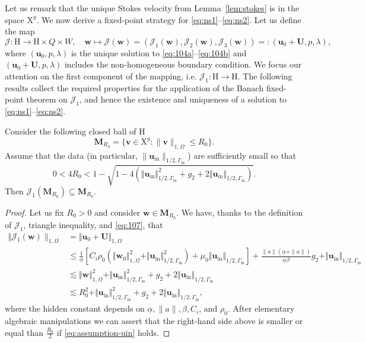 \documentclass[onefignum,onetabnum,reqno,a4paper,final]{siamart250211}
\def\O{\Omega}
\newcommand\bu{\boldsymbol{u}}
\newcommand\bv{\boldsymbol{v}}
\newcommand\bw{\boldsymbol{w}}
\newcommand\bM{\mathbf{M}}
\newcommand\0{\mathbf{0}}
\newcommand\bU{\boldsymbol{U}}
\newcommand\bH{\boldsymbol{\mathrm{H}}}
\newcommand\bX{\boldsymbol{\mathrm{X}}}
\renewcommand\O{\Omega}
\newcommand\Gi{\Gamma_{\mathrm{in}}}
\newcommand\buin{\boldsymbol{u}_{\mathrm{in}}}
\newcommand{\cred}[1]{{\leavevmode\color{red}{#1}}}
\numberwithin{figure}{section}
\numberwithin{table}{section}
\begin{document}
Let us remark that the unique Stokes velocity from Lemma~\ref{lem:stokes} is in the space $\bX^g$.  We now derive a fixed-point strategy for \eqref{eq:ns1}--\eqref{eq:ns2}. Let us define the map 
$$
\mathcal{J}:\bH\to \bH\times Q\times W, \quad \bw \mapsto 
	\mathcal{J}(\bw)=(\mathcal{J}_1(\bw),\mathcal{J}_2(\bw),\mathcal{J}_3(\bw))=:(\bu_0+\bU,p,\lambda),
$$
where $(\bu_0,p,\lambda)$ is the unique solution to \eqref{eq:104a}--\eqref{eq:104b} and $(\bu_0+\bU,p,\lambda)$ includes the non-homogeneous boundary condition. We focus our attention on the first component of the mapping, i.e.  $\mathcal{J}_1:\bH\rightarrow\bH$. The following results collect the required properties for the application of the Banach fixed-point theorem on $\mathcal{J}_1$, and hence the existence and uniqueness of a solution to \eqref{eq:ns1}--\eqref{eq:ns2}. 
\begin{lemma}\label{lem:ns-map}
 Consider the following closed ball of $\bH$
 \[\bM_{R_0} = \{ \bv \in \bX^g: \|\bv\|_{1,\Omega}\leq R_0\}. \]
 Assume that the data (in particular, $\|\bu_{\mathrm{in}}\|_{1/2,\Gi}$) are sufficiently small so that 
 \begin{equation}\label{eq:assumption-uin}  0<4R_0<1-\sqrt{1-4(\Vert \buin\Vert_{1/2,\Gi}^2 + g_2 + 2\Vert \buin\Vert_{1/2,\Gi})}. 
 \end{equation}
 Then $\mathcal{J}_1(\bM_{R_0}) \subseteq \bM_{R_0}$.
\end{lemma}
\begin{proof}
    Let us fix $R_0> 0$ and consider $\bw\in \bM_{R_0}$. We have, thanks to the definition of $\mathcal{J}_1$, triangle inequality, and \eqref{eq:107}, that 
    $$
    \begin{aligned}        \Vert\mathcal{J}_1(\bw)\|_{1,\Omega}&=\Vert\bu_0 + \bU \Vert_{1,\O}\\
    &\leq \frac{1}{\underline{\alpha}}\left[C_i\rho_0\left(\Vert\bw_0\Vert_{1,\O}^ 2 +\Vert \bu_{\mathrm{in}}\Vert_{1/2,\Gi}^2\right) + \mu_0\Vert \bu_{\mathrm{in}}\Vert_{1/2,\Gi}\right] %
    + \frac{\|a\|(\underline{\alpha}+\|a\|)}{\underline{\alpha}\beta}g_2+ \Vert \buin\Vert_{1/2,\Gi}\\
    &\lesssim \Vert\bw\Vert_{1,\O}^2 + \Vert \buin\Vert_{1/2,\Gi}^2 + g_2+ 2\Vert \buin\Vert_{1/2,\Gi}\\
    &\lesssim R_0^ 2+ \Vert \buin\Vert_{1/2,\Gi}^2 + g_2 + 2\Vert \buin\Vert_{1/2,\Gi},
    \end{aligned}
    $$
    where the hidden constant depends on $\underline{\alpha}, \|a\|, \beta, C_i$, and $\rho_0$. 
    After elementary algebraic manipulations we can assert that the right-hand side above is smaller or equal than $\frac{R_0}{2}$ if \eqref{eq:assumption-uin} holds. 
\end{proof}
\end{document}
